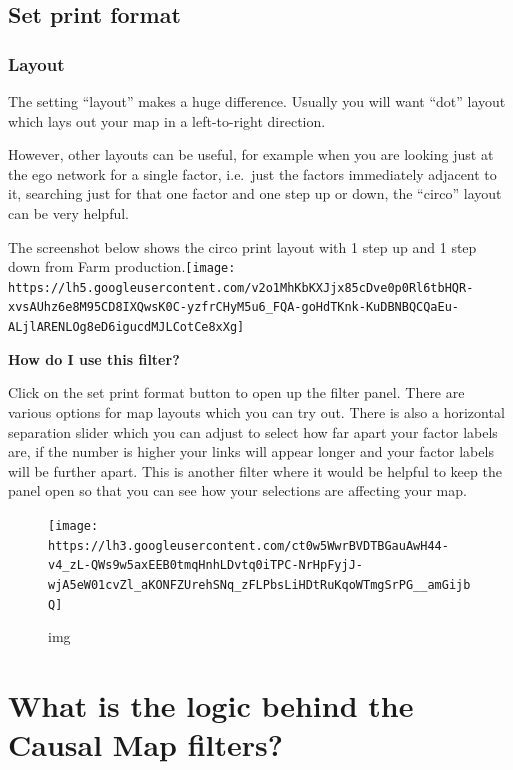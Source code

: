 \documentclass[
]{book}
\begin{document}
\hypertarget{set-print-format}{%
\section{Set print format}\label{set-print-format}}

\hypertarget{layout}{%
\subsection{Layout}\label{layout}}

The setting ``layout'' makes a huge difference. Usually you will want ``dot'' layout which lays out your map in a left-to-right direction.

However, other layouts can be useful, for example when you are looking just at the ego network for a single factor, i.e.~just the factors immediately adjacent to it, searching just for that one factor and one step up or down, the ``circo'' layout can be very helpful.

The screenshot below shows the circo print layout with 1 step up and 1 step down from Farm production.\texttt{[image: https://lh5.googleusercontent.com/v2o1MhKbKXJjx85cDve0p0Rl6tbHQR-xvsAUhz6e8M95CD8IXQwsK0C-yzfrCHyM5u6\_FQA-goHdTKnk-KuDBNBQCQaEu-ALjlARENLOg8eD6igucdMJLCotCe8xXg]}

\textbf{How do I use this filter?}

Click on the set print format button to open up the filter panel. There are various options for map layouts which you can try out. There is also a horizontal separation slider which you can adjust to select how far apart your factor labels are, if the number is higher your links will appear longer and your factor labels will be further apart. This is another filter where it would be helpful to keep the panel open so that you can see how your selections are affecting your map.

\begin{figure}
\centering
\texttt{[image: https://lh3.googleusercontent.com/ct0w5WwrBVDTBGauAwH44-v4\_zL-QWs9w5axEEB0tmqHnhLDvtq0iTPC-NrHpFyjJ-wjA5eW01cvZl\_aKONFZUrehSNq\_zFLPbsLiHDtRuKqoWTmgSrPG\_\_amGijbQ]}
\caption{img}
\end{figure}

\hypertarget{what-is-the-logic-behind-the-causal-map-filters}{%
\chapter{What is the logic behind the Causal Map filters?}\label{what-is-the-logic-behind-the-causal-map-filters}}
\end{document}
